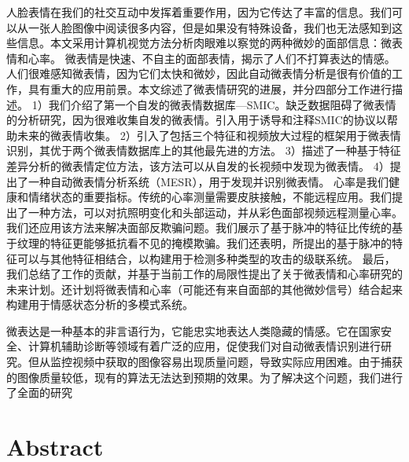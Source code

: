 人脸表情在我们的社交互动中发挥着重要作用，因为它传达了丰富的信息。我们可以从一张人脸图像中阅读很多内容，但是如果没有特殊设备，我们也无法感知到这些信息。本文采用计算机视觉方法分析肉眼难以察觉的两种微妙的面部信息：微表情和心率。
微表情是快速、不自主的面部表情，揭示了人们不打算表达的情感。人们很难感知微表情，因为它们太快和微妙，因此自动微表情分析是很有价值的工作，具有重大的应用前景。本文综述了微表情研究的进展，并分四部分工作进行描述。 1）我们介绍了第一个自发的微表情数据库—SMIC。缺乏数据阻碍了微表情的分析研究，因为很难收集自发的微表情。引入用于诱导和注释SMIC的协议以帮助未来的微表情收集。 2）引入了包括三个特征和视频放大过程的框架用于微表情识别，其优于两个微表情数据库上的其他最先进的方法。 3）描述了一种基于特征差异分析的微表情定位方法，该方法可以从自发的长视频中发现为微表情。 4）提出了一种自动微表情分析系统（MESR），用于发现并识别微表情。
心率是我们健康和情绪状态的重要指标。传统的心率测量需要皮肤接触，不能远程应用。我们提出了一种方法，可以对抗照明变化和头部运动，并从彩色面部视频远程测量心率。我们还应用该方法来解决面部反欺骗问题。我们展示了基于脉冲的特征比传统的基于纹理的特征更能够抵抗看不见的掩模欺骗。我们还表明，所提出的基于脉冲的特征可以与其他特征相结合，以构建用于检测多种类型的攻击的级联系统。
最后，我们总结了工作的贡献，并基于当前工作的局限性提出了关于微表情和心率研究的未来计划。还计划将微表情和心率（可能还有来自面部的其他微妙信号）结合起来构建用于情感状态分析的多模式系统。

微表达是一种基本的非言语行为，它能忠实地表达人类隐藏的情感。它在国家安全、计算机辅助诊断等领域有着广泛的应用，促使我们对自动微表情识别进行研究。但从监控视频中获取的图像容易出现质量问题，导致实际应用困难。由于捕获的图像质量较低，现有的算法无法达到预期的效果。为了解决这个问题，我们进行了全面的研究

\chapter*{Abstract}%

